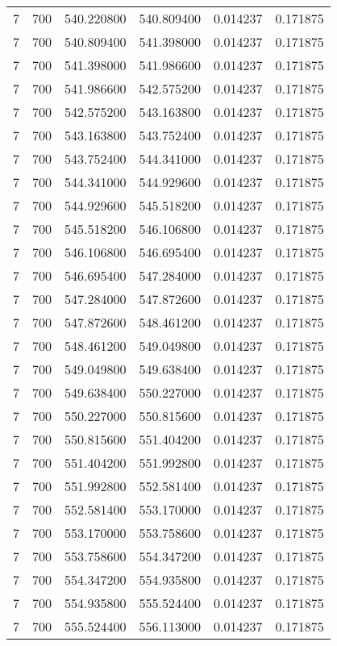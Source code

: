\begin{longtable}{rrrrrr}
7 & 700 & 540.220800 & 540.809400 & 0.014237 & 0.171875 \\
7 & 700 & 540.809400 & 541.398000 & 0.014237 & 0.171875 \\
7 & 700 & 541.398000 & 541.986600 & 0.014237 & 0.171875 \\
7 & 700 & 541.986600 & 542.575200 & 0.014237 & 0.171875 \\
7 & 700 & 542.575200 & 543.163800 & 0.014237 & 0.171875 \\
7 & 700 & 543.163800 & 543.752400 & 0.014237 & 0.171875 \\
7 & 700 & 543.752400 & 544.341000 & 0.014237 & 0.171875 \\
7 & 700 & 544.341000 & 544.929600 & 0.014237 & 0.171875 \\
7 & 700 & 544.929600 & 545.518200 & 0.014237 & 0.171875 \\
7 & 700 & 545.518200 & 546.106800 & 0.014237 & 0.171875 \\
7 & 700 & 546.106800 & 546.695400 & 0.014237 & 0.171875 \\
7 & 700 & 546.695400 & 547.284000 & 0.014237 & 0.171875 \\
7 & 700 & 547.284000 & 547.872600 & 0.014237 & 0.171875 \\
7 & 700 & 547.872600 & 548.461200 & 0.014237 & 0.171875 \\
7 & 700 & 548.461200 & 549.049800 & 0.014237 & 0.171875 \\
7 & 700 & 549.049800 & 549.638400 & 0.014237 & 0.171875 \\
7 & 700 & 549.638400 & 550.227000 & 0.014237 & 0.171875 \\
7 & 700 & 550.227000 & 550.815600 & 0.014237 & 0.171875 \\
7 & 700 & 550.815600 & 551.404200 & 0.014237 & 0.171875 \\
7 & 700 & 551.404200 & 551.992800 & 0.014237 & 0.171875 \\
7 & 700 & 551.992800 & 552.581400 & 0.014237 & 0.171875 \\
7 & 700 & 552.581400 & 553.170000 & 0.014237 & 0.171875 \\
7 & 700 & 553.170000 & 553.758600 & 0.014237 & 0.171875 \\
7 & 700 & 553.758600 & 554.347200 & 0.014237 & 0.171875 \\
7 & 700 & 554.347200 & 554.935800 & 0.014237 & 0.171875 \\
7 & 700 & 554.935800 & 555.524400 & 0.014237 & 0.171875 \\
7 & 700 & 555.524400 & 556.113000 & 0.014237 & 0.171875 \\

\end{longtable}
